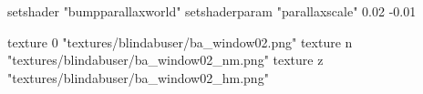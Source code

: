 	setshader "bumpparallaxworld"
	setshaderparam "parallaxscale" 0.02 -0.01

		texture 0 "textures/blindabuser/ba_window02.png"
		texture n "textures/blindabuser/ba_window02_nm.png"
		texture z "textures/blindabuser/ba_window02_hm.png"
